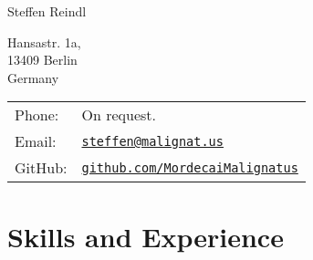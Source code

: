 \documentclass[a4paper]{article}
\def\name{Steffen Reindl}
\begin{document}
{\huge \name}
\vspace{0.25in}

\begin{minipage}{0.45\linewidth}
  Hansastr. 1a, \\
  13409 Berlin \\
  Germany
\end{minipage}
\begin{minipage}{0.45\linewidth}
  \begin{tabular}{ll}
    Phone: & On request. \\
    Email: & \href{mailto:steffen@malignat.us}{\tt steffen@malignat.us} \\
    GitHub: & \href{https://github.com/MordecaiMalignatus/}{\tt github.com/MordecaiMalignatus}
  \end{tabular}
\end{minipage}

\section*{Skills and Experience}
\end{document}

